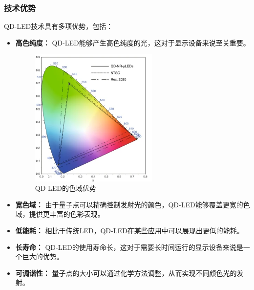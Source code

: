 \documentclass[12pt,hyperref,a4paper,UTF8]{ctexart}
\begin{document}
\subsubsection*{技术优势}
QD-LED技术具有多项优势，包括：
\begin{itemize}
  \item \textbf{高色纯度：} QD-LED能够产生高色纯度的光，这对于显示设备来说至关重要。
  \begin{figure}[H]
    \centering
    \includegraphics[width=0.6\textwidth]{figures/fig/image2.png}
    \caption{QD-LED的色域优势\cite{liu2020micro}}
\end{figure}
  \item \textbf{宽色域：} 由于量子点可以精确控制发射光的颜色，QD-LED能够覆盖更宽的色域，提供更丰富的色彩表现。
  \item \textbf{低能耗：} 相比于传统LED，QD-LED在某些应用中可以展现出更低的能耗。
  \item \textbf{长寿命：} QD-LED的使用寿命长，这对于需要长时间运行的显示设备来说是一个巨大的优势。
  \item \textbf{可调谐性：} 量子点的大小可以通过化学方法调整，从而实现不同颜色光的发射。
\end{itemize}
\end{document}
